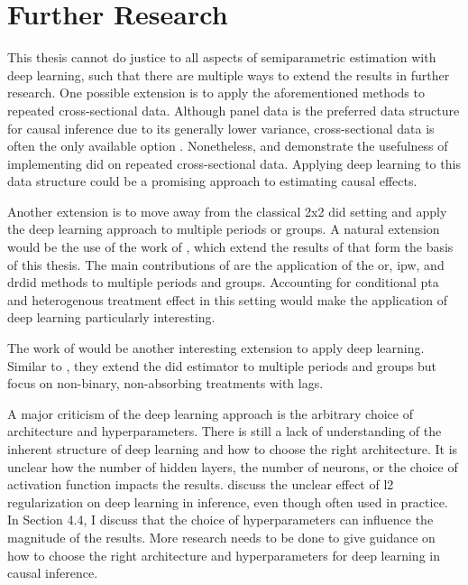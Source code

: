\section{Further Research}


This thesis cannot do justice to all aspects of semiparametric estimation with deep learning, such that there are multiple ways to extend the results in further research.
One possible extension is to apply the aforementioned methods to repeated cross-sectional data.
Although panel data is the preferred data structure for causal inference due to its generally lower variance, cross-sectional data is often the only available option \citep{wooldridge2010econometric}.
Nonetheless, \citet{santannaDoublyRobustDifferenceindifferences2020} and \citet{manfeDifferenceInDifferenceDesignRepeated} demonstrate the usefulness of implementing \ac{did} on repeated cross-sectional data.
Applying deep learning to this data structure could be a promising approach to estimating causal effects.

Another extension is to move away from the classical 2x2 \ac{did} setting and apply the deep learning approach to multiple periods or groups.
A natural extension would be the use of the work of \citet{callawayDifferenceinDifferencesMultipleTime2021}, which extend the results of \citet{santannaDoublyRobustDifferenceindifferences2020} that form the basis of this thesis.
The main contributions of  \citet{callawayDifferenceinDifferencesMultipleTime2021} are the application of the \ac{or}, \ac{ipw}, and \ac{drdid} methods to multiple periods and groups.
Accounting for conditional \ac{pta} and heterogenous treatment effect in this setting would make the application of deep learning particularly interesting.

The work of \citet{dechaisemartinDifferenceinDifferencesEstimatorsIntertemporal2024} would be another interesting extension to apply deep learning.
Similar to \citet{callawayDifferenceinDifferencesMultipleTime2021}, they extend the \ac{did} estimator to multiple periods and groups but focus on non-binary, non-absorbing treatments with lags.

A major criticism of the deep learning approach is the arbitrary choice of architecture and hyperparameters.
There is still a lack of understanding of the inherent structure of deep learning and how to choose the right architecture.
It is unclear how the number of hidden layers, the number of neurons, or the choice of activation function impacts the results.
\citet{farrellDeepNeuralNetworks2021} discuss the unclear effect of l2 regularization on deep learning in inference, even though often used in practice.
In Section 4.4, I discuss that the choice of hyperparameters can influence the magnitude of the results.
More research needs to be done to give guidance on how to choose the right architecture and hyperparameters for deep learning in causal inference.

